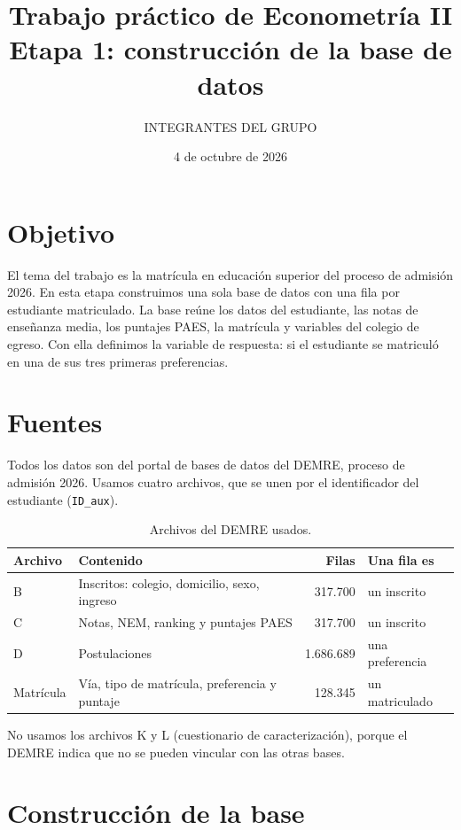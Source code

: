 \documentclass[11pt,letterpaper]{article}
\title{Trabajo práctico de Econometría II\\Etapa 1: construcción de la base de datos}
\author{INTEGRANTES DEL GRUPO}
\date{4 de octubre de 2026}
\begin{document}
\sloppy
\maketitle

\section{Objetivo}

El tema del trabajo es la matrícula en educación superior del proceso de admisión 2026. En esta etapa construimos una sola base de datos con una fila por estudiante matriculado. La base reúne los datos del estudiante, las notas de enseñanza media, los puntajes PAES, la matrícula y variables del colegio de egreso. Con ella definimos la variable de respuesta: si el estudiante se matriculó en una de sus tres primeras preferencias.

\section{Fuentes}

Todos los datos son del portal de bases de datos del DEMRE, proceso de admisión 2026. Usamos cuatro archivos, que se unen por el identificador del estudiante (\texttt{ID\_aux}).

\begin{table}[h]
\centering
\begin{tabular}{llrl}
\toprule
Archivo & Contenido & Filas & Una fila es \\
\midrule
B & Inscritos: colegio, domicilio, sexo, ingreso & 317.700 & un inscrito \\
C & Notas, NEM, ranking y puntajes PAES & 317.700 & un inscrito \\
D & Postulaciones & 1.686.689 & una preferencia \\
Matrícula & Vía, tipo de matrícula, preferencia y puntaje & 128.345 & un matriculado \\
\bottomrule
\end{tabular}
\caption{Archivos del DEMRE usados.}
\end{table}

No usamos los archivos K y L (cuestionario de caracterización), porque el DEMRE indica que no se pueden vincular con las otras bases.

\section{Construcción de la base}
\end{document}

